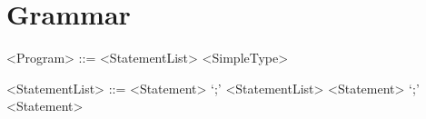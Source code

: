 \section{Grammar}
\begin{grammar}
<Program> ::= <StatementList> <SimpleType>

<StatementList> ::= <Statement> ‘;’ <StatementList>
 \alt <Statement> ‘;’
 \alt <Statement>
\end{grammar}